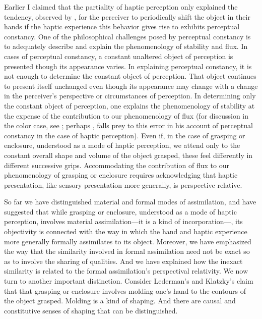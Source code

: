 Earlier I claimed that the partiality of haptic perception only explained the tendency, observed by \citet{Lederman:1987fr}, for the perceiver to periodically shift the object in their hands if the haptic experience this behavior gives rise to exhibits perceptual constancy. One of the philosophical challenges posed by perceptual constancy is to adequately describe and explain the phenomenology of stability and flux. In cases of perceptual constancy, a constant unaltered object of perception is presented though its appearance varies. In explaining perceptual constancy, it is not enough to determine the constant object of perception. That object continues to present itself unchanged even though its appearance may change with a change in the perceiver's perspective or circumstances of perception. In determining only the constant object of perception, one explains the phenomenology of stability at the expense of the contribution to our phenomenology of flux (for discussion in the color case, see \citealt{Cohen:2008hc,Hilbert:2007qy}; perhaps \citealt[98]{Fulkerson:2014ek}, falls prey to this error in his account of perceptual constancy in the case of haptic perception). Even if, in the case of grasping or enclosure, understood as a mode of haptic perception, we attend only to the constant overall shape and volume of the object grasped, these feel differently in different successive grips. Accommodating the contribution of flux to our phenomenology of grasping or enclosure requires acknowledging that haptic presentation, like sensory presentation more generally, is perspective relative.

So far we have distinguished material and formal modes of assimilation, and have suggested that while grasping or enclosure, understood as a mode of haptic perception, involves material assimilation---it is a kind of incorporation---, its objectivity is connected with the way in which the hand and  haptic experience more generally formally assimilates to its object. Moreover, we have emphasized the way that the similarity involved in formal assimilation need not be exact so as to involve the sharing of qualities. And we have explained how the inexact similarity is related to the formal assimilation's perspectival relativity. We now turn to another important distinction. Consider Lederman's and Klatzky's \citeyearpar{Lederman:1987fr} claim that that grasping or enclosure involves molding one's hand to the contours of the object grasped. Molding is a kind of shaping. And there are causal and constitutive senses of shaping that can be distinguished. 

